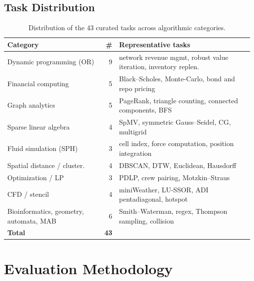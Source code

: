 \documentclass{article}
\begin{document}
\subsection{Task Distribution}

\begin{table}[ht]
\centering
\small
\caption{Distribution of the 43 curated tasks across algorithmic categories.}
\label{tab:categories}
\begin{tabular}{@{}lrl@{}}
\toprule
\textbf{Category} & \textbf{\#} & \textbf{Representative tasks} \\
\midrule
Dynamic programming (OR)     & 9 & network revenue mgmt, robust value iteration, inventory replen. \\
Financial computing          & 5 & Black--Scholes, Monte-Carlo, bond and repo pricing \\
Graph analytics              & 5 & PageRank, triangle counting, connected components, BFS \\
Sparse linear algebra        & 4 & SpMV, symmetric Gauss--Seidel, CG, multigrid \\
Fluid simulation (SPH)       & 3 & cell index, force computation, position integration \\
Spatial distance / cluster.  & 4 & DBSCAN, DTW, Euclidean, Hausdorff \\
Optimization / LP            & 3 & PDLP, crew pairing, Motzkin--Straus \\
CFD / stencil                & 4 & miniWeather, LU-SSOR, ADI pentadiagonal, hotspot \\
Bioinformatics, geometry, automata, MAB & 6 & Smith--Waterman, regex, Thompson sampling, collision \\
\midrule
\textbf{Total}               & \textbf{43} & \\
\bottomrule
\end{tabular}
\end{table}

\section{Evaluation Methodology}
\label{sec:eval}
\end{document}
